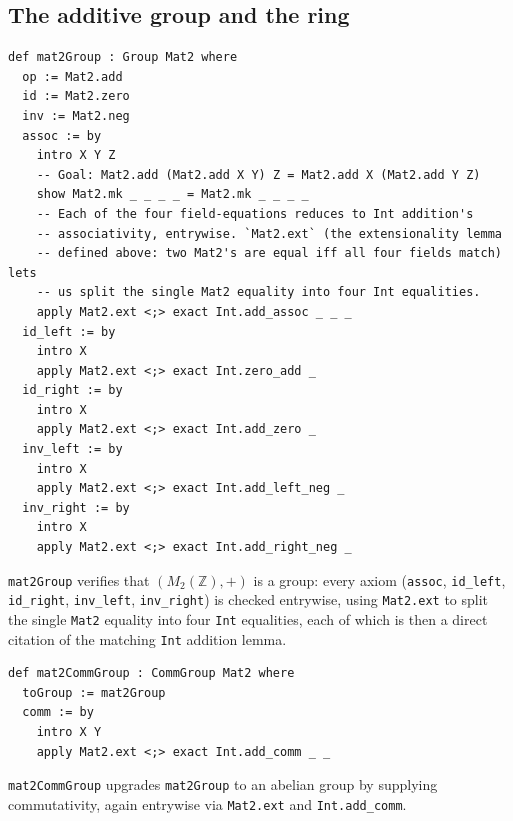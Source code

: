 \subsection{The additive group and the ring}\label{sec:08-rings:07-matrices:3}

\begin{lstlisting}
def mat2Group : Group Mat2 where
  op := Mat2.add
  id := Mat2.zero
  inv := Mat2.neg
  assoc := by
    intro X Y Z
    -- Goal: Mat2.add (Mat2.add X Y) Z = Mat2.add X (Mat2.add Y Z)
    show Mat2.mk _ _ _ _ = Mat2.mk _ _ _ _
    -- Each of the four field-equations reduces to Int addition's
    -- associativity, entrywise. `Mat2.ext` (the extensionality lemma
    -- defined above: two Mat2's are equal iff all four fields match) lets
    -- us split the single Mat2 equality into four Int equalities.
    apply Mat2.ext <;> exact Int.add_assoc _ _ _
  id_left := by
    intro X
    apply Mat2.ext <;> exact Int.zero_add _
  id_right := by
    intro X
    apply Mat2.ext <;> exact Int.add_zero _
  inv_left := by
    intro X
    apply Mat2.ext <;> exact Int.add_left_neg _
  inv_right := by
    intro X
    apply Mat2.ext <;> exact Int.add_right_neg _
\end{lstlisting}

\texttt{mat2Group} verifies that \((M_2(\mathbb{Z}), +)\) is a group: every axiom (\texttt{assoc}, \texttt{id\_\allowbreak{}left}, \texttt{id\_\allowbreak{}right}, \texttt{inv\_\allowbreak{}left}, \texttt{inv\_\allowbreak{}right}) is checked entrywise, using \texttt{Mat2.ext} to split the single \texttt{Mat2} equality into four \texttt{Int} equalities, each of which is then a direct citation of the matching \texttt{Int} addition lemma.

\begin{lstlisting}
def mat2CommGroup : CommGroup Mat2 where
  toGroup := mat2Group
  comm := by
    intro X Y
    apply Mat2.ext <;> exact Int.add_comm _ _
\end{lstlisting}

\texttt{mat2CommGroup} upgrades \texttt{mat2Group} to an abelian group by supplying commutativity, again entrywise via \texttt{Mat2.ext} and \texttt{Int.add\_\allowbreak{}comm}.

